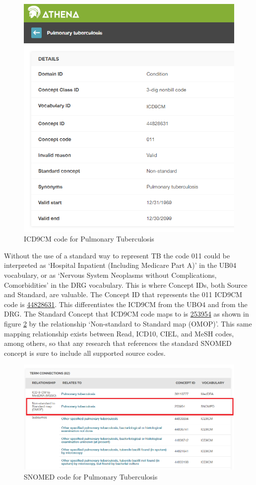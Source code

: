 \documentclass[]{book}
\begin{document}
\begin{figure}

{\centering \includegraphics[width=0.75\linewidth]{images/CommonDataModel/pulmTubICD9} 

}

\caption{ICD9CM code for Pulmonary Tuberculosis}\label{fig:pulmTubICD9}
\end{figure}

Without the use of a standard way to represent TB the code 011 could be
interpreted as `Hospital Inpatient (Including Medicare Part A)' in the
UB04 vocabulary, or as `Nervous System Neoplasms without Complications,
Comorbidities' in the DRG vocabulary. This is where Concept IDs, both
Source and Standard, are valuable. The Concept ID that represents the
011 ICD9CM code is
\href{http://athena.ohdsi.org/search-terms/terms/44828631}{44828631}.
This differentiates the ICD9CM from the UBO4 and from the DRG. The
Standard Concept that ICD9CM code maps to is
\href{http://athena.ohdsi.org/search-terms/terms/253954}{253954} as
shown in figure \ref{fig:pulmTubMap} by the relationship `Non-standard
to Standard map (OMOP)'. This same mapping relationship exists between
Read, ICD10, CIEL, and MeSH codes, among others, so that any research
that references the standard SNOMED concept is sure to include all
supported source codes.

\begin{figure}
\includegraphics[width=1\linewidth]{images/CommonDataModel/pulmTubMap} \caption{SNOMED code for Pulmonary Tuberculosis}\label{fig:pulmTubMap}
\end{figure}
\end{document}
